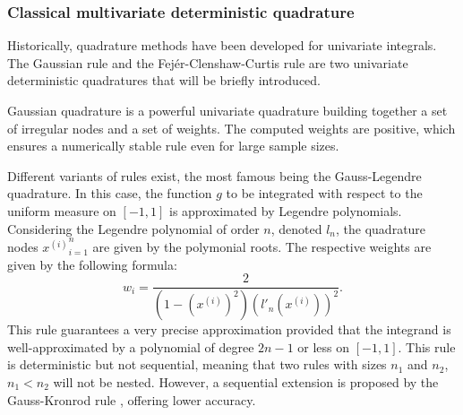 
\subsubsection{Classical multivariate deterministic quadrature}

Historically, quadrature methods have been developed for univariate integrals. 
The Gaussian rule and the Fejér-Clenshaw-Curtis rule are two univariate deterministic quadratures that will be briefly introduced. 

Gaussian quadrature is a powerful univariate quadrature building together a set of irregular nodes and a set of weights. 
The computed weights are positive, which ensures a numerically stable rule even for large sample sizes.

Different variants of rules exist, the most famous being the Gauss-Legendre quadrature. 
In this case, the function $g$ to be integrated with respect to the uniform measure on $[-1, 1]$ is approximated by Legendre polynomials.
Considering the Legendre polynomial of order $n$, denoted $l_n$, the quadrature nodes ${x^{(i)}}_{i=1}^n$ are given by the polymonial roots.
The respective weights are given by the following formula: 
\begin{equation}
    w_{i}={\frac {2}{\left(1-\left(x^{(i)}\right)^{2}\right)\left(l'_{n}(x^{(i)})\right)^{2}}}.
\end{equation}
This rule guarantees a very precise approximation provided that the integrand is well-approximated by a polynomial of degree $2n-1$ or less on $[-1, 1]$.
This rule is deterministic but not sequential, meaning that two rules with sizes $n_1$ and $n_2$, $n_1 < n_2$ will not be nested. 
However, a sequential extension is proposed by the Gauss-Kronrod rule \citep{laurie_1997}, offering lower accuracy. 

